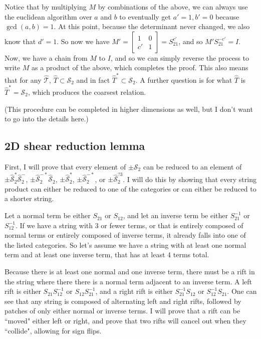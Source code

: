 \documentclass{article}
\def\T{\mathcal{T}}
\def\S{\mathcal{S}}
\begin{document}
Notice that by multiplying $M$ by combinations of the above, we can always use the euclidean algorithm over $a$ and $b$ to eventually get $a'=1,b'=0$ because $\gcd(a,b)=1$. At this point, because the determinant never changed, we also know that $d'=1$. So now we have $M'=\begin{bmatrix}1 & 0\\c' & 1\end{bmatrix}=S_{21}^{c'}$, and so $M'S_{21}^{-c'}=I$. Now, we have a chain from $M$ to $I$, and so we can simply reverse the process to write $M$ as a product of the above, which completes the proof. This also means that for any $\hat{\T}$, $\hat{T}\subset \S_2$ and in fact $\hat{T}^*\subset \S_2$. A further question is for what $\hat{T}$ is $\hat{T}^* = \S_2$, which produces the coarsest relation.

(This procedure can be completed in higher dimensions as well, but I don't want to go into the details here.)

\subsection{2D shear reduction lemma}
First, I will prove that every element of $\pm\S_2$ can be reduced to an element of $\pm\hat{\S}_2^*\hat{\S}_2^-$, $\pm\hat{\S}_2^{-*}\hat{\S}_2$, $\pm\hat{\S}_2^*$, $\pm\hat{\S}_2^{-*}$, or $\pm\hat{\S}_2^{?3}$. I will do this by showing that every string product can either be reduced to one of the categories or can either be reduced to a shorter string.

Let a normal term be either $S_{21}$ or $S_{12}$, and let an inverse term be either $S_{21}^{-1}$ or $S_{12}^{-1}$. If we have a string with 3 or fewer terms, or that is entirely composed of normal terms or entirely composed of inverse terms, it already falls into one of the listed categories. So let's assume we have a string with at least one normal term and at least one inverse term, that has at least 4 terms total.

Because there is at least one normal and one inverse term, there must be a rift in the string where there there is a normal term adjacent to an inverse term. A left rift is either $S_{21}S_{12}^{-1}$ or $S_{12}S_{21}^{-1}$, and a right rift is either $S_{21}^{-1}S_{12}$ or $S_{12}^{-1}S_{21}$. One can see that any string is composed of alternating left and right rifts, followed by patches of only either normal or inverse terms. I will prove that a rift can be ``moved" either left or right, and prove that two rifts will cancel out when they ``collide", allowing for sign flips.
\end{document}
